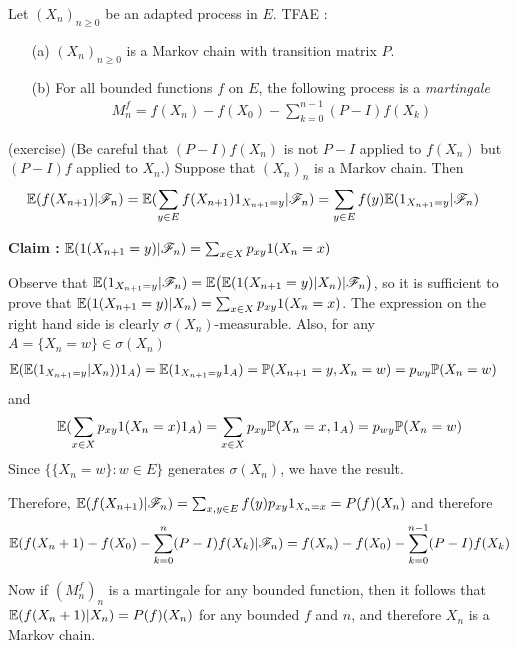 \documentclass[10pt,a4paper]{report}
\newenvironment{proof}
{\begin{changemargin}{1cm}{0.5cm} 
	}%
	{\end{changemargin}
}
\newenvironment{subproof}
{\begin{changemargin}{0.5cm}{0.5cm} 
	}%
	{\end{changemargin}
}
\begin{document}
 Let $(X_n)_{n\geq 0}$ be an adapted process in $E$. TFAE :
\begin{itemize}
\item[(a)] $(X_n)_{n\geq 0}$ is a Markov chain with transition matrix $P$.
\item[(b)] For all bounded functions $f$ on $E$, the following process is a \emph{martingale}
\begin{align*}
M^f_n = f(X_n) - f(X_0) - \sum_{k=0}^{n-1} (P-I) f(X_k)
\end{align*}
\end{itemize}
\begin{proof}
\pf (exercise) (Be careful that $(P-I)f(X_n)$ is not $P-I$ applied to $f(X_n)$ but $(P-I)f$ applied to $X_n$.) Suppose that $(X_n)_n$ is a Markov chain. Then
\begin{align*}
& \mathbb{E}(f(X_{n+1}) |\mathscr{F}_n) = \mathbb{E}( \sum_{y\in E} f(X_{n+1}) 1_{X_{n+1}=y} | \mathscr{F}_n) = \sum_{y\in E} f(y) \mathbb{E}( 1_{X_{n+1}=y} |\mathscr{F}_n)
\end{align*}
\begin{subproof}
\textbf{Claim :} $\mathbb{E}(1(X_{n+1}=y) |\mathscr{F}_n) = \sum_{x\in X} p_{xy} 1(X_n = x)$

\pf Observe that $\mathbb{E}(1_{X_{n+1}=y} |\mathscr{F}_n)= \mathbb{E}\big(\mathbb{E}(1(X_{n+1}=y) |X_n) |\mathscr{F}_n \big)$, so it is sufficient to prove that $\mathbb{E}(1(X_{n+1}=y) |X_n) = \sum_{x\in X} p_{xy} 1(X_n = x)$. The expression on the right hand side is clearly $\sigma(X_n)$-measurable. Also, for any $A = \{X_n = w\} \in \sigma(X_n)$
\begin{align*}
&\mathbb{E}( \mathbb{E}(1_{X_{n+1}=y} |X_n)) 1_A ) = \mathbb{E}( 1_{X_{n+1}=y} 1_A ) = \mathbb{P}(X_{n+1}=y, X_n = w) = p_{wy} \mathbb{P}(X_n =w)
\end{align*}
and
\begin{align*}
\mathbb{E}(\sum_{x\in X} p_{xy} 1(X_n = x) 1_A) = \sum_{x\in X}p_{xy} \mathbb{P}(X_n =x, 1_A) = p_{wy} \mathbb{P}(X_n = w)
\end{align*}
Since $\{ \{X_n = w\} : w\in E\}$ generates $\sigma(X_n)$, we have the result.
\end{subproof}
Therefore, 
$\mathbb{E}(f(X_{n+1}) |\mathscr{F}_n) = \sum_{x,y\in E} f(y) p_{xy} 1_{X_n = x} = P(f)(X_n)$ and therefore
\begin{align*}
\mathbb{E}(f(X_n+1) - f(X_0) - \sum_{k=0}^{n} (P-I) f(X_k) |\mathscr{F}_n) = f(X_n) - f(X_0) - \sum_{k=0}^{n-1} (P-I) f(X_k)
\end{align*}
\s

Now if $(M^f_n)_n$ is a martingale for any bounded function, then it follows that $\mathbb{E}(f(X_n+1)|X_n) = P(f)(X_n)$ for any bounded $f$ and $n$, and therefore $X_n$ is a Markov chain.
\end{proof}
\s
\end{document}

